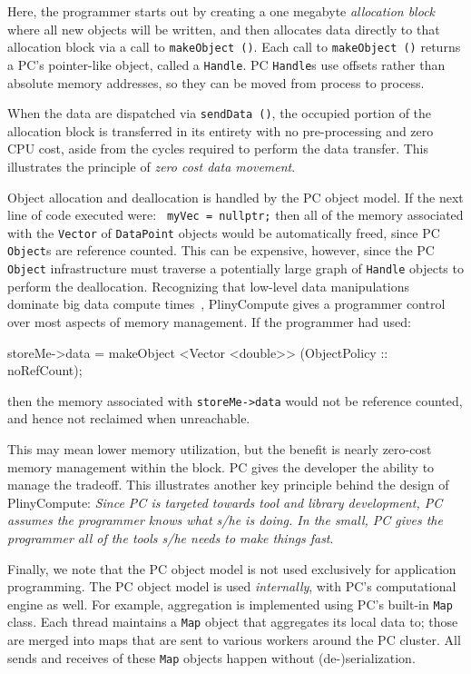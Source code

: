 \noindent
Here, the programmer starts out by creating a one megabyte \emph{allocation block} where all new objects will be written,
and then allocates data directly to that allocation block via a call to \texttt{makeObject ()}.  Each call to  \texttt{makeObject ()}
returns a PC's pointer-like object, called a \texttt{Handle}.  PC \texttt{Handle}s use offsets rather than absolute memory
addresses, so they can be moved from process to process.  

When the data are dispatched via \texttt{sendData ()},
the occupied
portion of the allocation block is transferred in its entirety with
no pre-processing and zero CPU cost, aside from the cycles required to perform the data transfer.  
This illustrates the principle of \emph{zero cost data movement}.

Object allocation and deallocation 
is handled by the PC object model.
If the next line of code executed were:
\texttt{
myVec = nullptr;}
then all of the memory associated with the \texttt{Vector} of \texttt{DataPoint} objects would be automatically
freed, since PC \texttt{Object}s are reference counted.  This can
be expensive, however, since the PC \texttt{Object} infrastructure must traverse a potentially large graph of \texttt{Handle} objects to perform the deallocation.  
Recognizing that low-level data manipulations dominate big data
compute times~\cite{ousterhout2015making, shi2015clash}, PlinyCompute gives a programmer control
over most aspects of memory management. If the 
programmer had used: 

\begin{codesmall}
storeMe->data = makeObject <Vector <double>>
     (ObjectPolicy :: noRefCount);
\end{codesmall}


\noindent then the memory associated with \texttt{storeMe->data} would
not be reference counted, and hence not reclaimed when unreachable.  

This may mean lower memory utilization,
but the benefit is nearly zero-cost memory management within the block.
PC gives the developer the ability to manage the tradeoff.
This illustrates another key principle behind the design of
PlinyCompute: \emph{Since PC is targeted towards tool and library
  development, PC assumes the programmer knows what s/he is doing.  In
  the small, PC gives the programmer all of the tools s/he needs to make things fast}.

Finally, we note that the PC object model is not used exclusively 
for application programming.  The PC object model
is used \emph{internally}, with PC's computational engine as well.
For example, aggregation is implemented using PC's built-in
\texttt{Map} class.  Each thread maintains
a \texttt{Map} object that aggregates its local data to; those are
merged into maps that are sent to various workers around the PC
cluster.  All sends and receives of these \texttt{Map} objects happen
without (de-)serialization.

